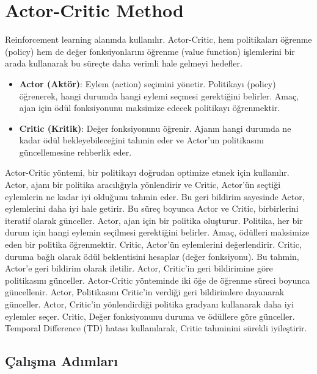 \section{Actor-Critic Method}

Reinforcement learning alanında kullanılır. Actor-Critic, hem politikaları öğrenme (policy) hem de değer fonksiyonlarını öğrenme (value function) işlemlerini bir arada kullanarak bu süreçte daha verimli hale gelmeyi hedefler.

\begin{itemize}
    \item \textbf{Actor (Aktör)}: Eylem (action) seçimini yönetir. Politikayı (policy) öğrenerek, hangi durumda hangi eylemi seçmesi gerektiğini belirler. Amaç, ajan için ödül fonksiyonunu maksimize edecek politikayı öğrenmektir.
    \item \textbf{Critic (Kritik)}: Değer fonksiyonunu öğrenir. Ajanın hangi durumda ne kadar ödül bekleyebileceğini tahmin eder ve Actor'un politikasını güncellemesine rehberlik eder.
\end{itemize}

Actor-Critic yöntemi, bir politikayı doğrudan optimize etmek için kullanılır. Actor, ajanı bir politika aracılığıyla yönlendirir ve Critic, Actor'ün seçtiği eylemlerin ne kadar iyi olduğunu tahmin eder. Bu geri bildirim sayesinde Actor, eylemlerini daha iyi hale getirir. Bu süreç boyunca Actor ve Critic, birbirlerini iteratif olarak günceller. Actor, ajan için bir politika oluşturur. Politika, her bir durum için hangi eylemin seçilmesi gerektiğini belirler. Amaç, ödülleri maksimize eden bir politika öğrenmektir.  Critic, Actor’ün eylemlerini değerlendirir. Critic, duruma bağlı olarak ödül beklentisini hesaplar (değer fonksiyonu). Bu tahmin, Actor'e geri bildirim olarak iletilir. Actor, Critic’in geri bildirimine göre politikasını günceller. Actor-Critic yönteminde iki öğe de öğrenme süreci boyunca güncellenir. Actor, Politikasını Critic'in verdiği geri bildirimlere dayanarak günceller. Actor, Critic’in yönlendirdiği politika gradyanı kullanarak daha iyi eylemler seçer. Critic, Değer fonksiyonunu duruma ve ödüllere göre günceller. Temporal Difference (TD) hatası kullanılarak, Critic tahminini sürekli iyileştirir.

\subsection{Çalışma Adımları}

